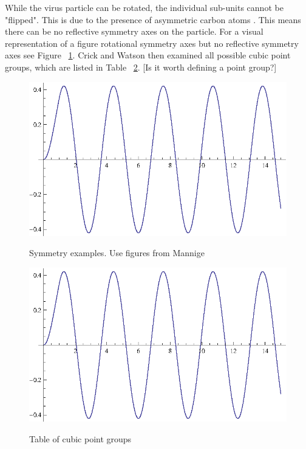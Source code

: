\documentclass[12pt,letter]{article}
\begin{document}
While the virus particle can be rotated, the individual sub-units cannot be "flipped". This is due to the presence of asymmetric carbon atoms \cite[p 474]{Crick:1956}. This means there can be no reflective symmetry axes on the particle. For a visual representation of a figure rotational symmetry axes but no reflective symmetry axes see Figure ~\ref{fig:reflect}. Crick and Watson then examined all possible cubic point groups, which are listed in Table ~\ref{table:cubic_groups}. [Is it worth defining a point group?]

\begin{figure}[h]
	\caption{Symmetry examples. Use figures from Mannige}
	\centering
	\includegraphics{place_holder.eps}
	\label{fig:reflect}
\end{figure}

\begin{figure}[h]
	\caption{Table of cubic point groups}
	\centering
	\includegraphics{place_holder.eps}
	\label{table:cubic_groups}
\end{figure}
\end{document}

